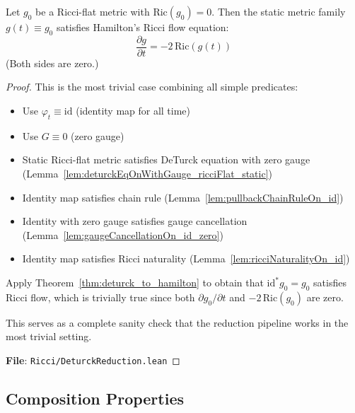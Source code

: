 \begin{corollary}
\label{cor:deturck_to_hamilton_id_ricciFlat}
\leanok
{}
Let $g_0$ be a Ricci-flat metric with $\mathrm{Ric}(g_0) = 0$. Then the static metric family $g(t) \equiv g_0$ satisfies Hamilton's Ricci flow equation:
\[ \frac{\partial g}{\partial t} = -2\,\mathrm{Ric}(g(t)) \]
(Both sides are zero.)
\end{corollary}

\begin{proof}
\leanok
{}
This is the most trivial case combining all simple predicates:
\begin{itemize}
\item Use $\varphi_t \equiv \mathrm{id}$ (identity map for all time)
\item Use $G \equiv 0$ (zero gauge)
\item Static Ricci-flat metric satisfies DeTurck equation with zero gauge (Lemma~\ref{lem:deturckEqOnWithGauge_ricciFlat_static})
\item Identity map satisfies chain rule (Lemma~\ref{lem:pullbackChainRuleOn_id})
\item Identity with zero gauge satisfies gauge cancellation (Lemma~\ref{lem:gaugeCancellationOn_id_zero})
\item Identity map satisfies Ricci naturality (Lemma~\ref{lem:ricciNaturalityOn_id})
\end{itemize}
Apply Theorem~\ref{thm:deturck_to_hamilton} to obtain that $\mathrm{id}^* g_0 = g_0$ satisfies Ricci flow, which is trivially true since both $\partial g_0/\partial t$ and $-2\,\mathrm{Ric}(g_0)$ are zero.

This serves as a complete sanity check that the reduction pipeline works in the most trivial setting.

\textbf{File}: \texttt{Ricci/DeturckReduction.lean}
\end{proof}

\subsection{Composition Properties}

